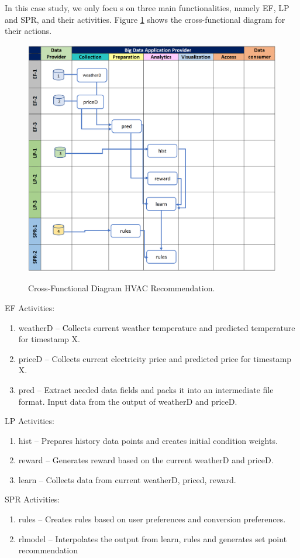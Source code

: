 In this case study, we only focu s on three main functionalities, namely EF, LP and SPR, and their
activities. Figure \ref{fig:hvac-2} shows the cross-functional diagram for their actions.



\begin{figure}[htb]
\includegraphics[width=1.0\textwidth]{usecase/hvac-2.png}
\label{fig:hvac-2}
\caption{Cross-Functional Diagram HVAC Recommendation.}
\end{figure}


EF Activities:

\begin{enumerate}
\item weatherD – Collects current weather temperature and predicted temperature for timestamp
X.
\item priceD – Collects current electricity price and predicted price for timestamp X.
\item pred – Extract needed data fields and packs it into an intermediate file format. Input data
from the output of weatherD and priceD.
\end{enumerate}


LP Activities:

\begin{enumerate}
\item hist – Prepares history data points and creates initial condition weights.
\item reward – Generates reward based on the current weatherD and priceD.
\item learn – Collects data from current weatherD, priced, reward.
\end{enumerate}

SPR Activities:

\begin{enumerate}
\item rules – Creates rules based on user preferences and conversion preferences.
\item rlmodel – Interpolates the output from learn, rules and generates set point recommendation
\end{enumerate}


